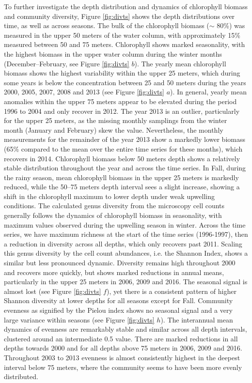 \documentclass[draft]{agujournal2019}
\begin{document}
To further investigate the depth distribution and dynamics of chlorophyll biomass and community diversity, Figure \ref{fig:divts} shows the depth distributions over time, as well as across seasons. The bulk of the chlorophyll biomass ($\sim$ 80\%) was measured in the upper 50 meters of the water column, with approximately 15\% measured between 50 and 75 meters. Chlorophyll shows marked seasonality, with the highest biomass in the upper water column during the winter months (December–February, see Figure \ref{fig:divts} $b$). The yearly mean chlorophyll biomass shows the highest variability within the upper 25 meters, which during some years is below the concentration between 25 and 50 meters during the years 2000, 2005, 2007, 2008 and 2013 (see Figure \ref{fig:divts} $a$). In general, yearly mean anomalies within the upper 75 meters appear to be elevated during the period 1996 to 2004 and only recover in 2012. The year 2013 is an outlier, particularly for the upper 25 meters, as the missing monthly samplings from the winter month (January and February) skew the value. Nevertheless, the monthly measurements for the remainder of the year 2013 show a markedly lower biomass (65\% compared to the mean over the entire time series for these months), which recovers in 2014. Chlorophyll biomass below 50 meters depth shows a relatively stable distribution throughout the year and across the time series. In Fall, during the rainy season, mean chlorophyll biomass in the upper 25 meters is markedly reduced, while the 50–75 meters depth interval sees a slight increase, showing a shift in the chlorophyll maximum to lower depth under weak upwelling conditions.
The calculated genus diversity from the microscopy cell counts generally follows the dynamics of chlorophyll biomass in seasonality, with maximum values observed during the upwelling season in winter. Across the time series, we have maximum richness at the start of the time series (1996-1997), then a reduction in diversity across all depths, which only recovers past 2011. Scaling this genus diversity by the cell count abundances, i.e. the Shannon Index, shows a similar but less pronounced dynamic. Diversity remains high throughout 2000 and recovers more quickly, but shows marked reductions in annual means, particularly in the upper 25 meters in 2006, 2009 and 2016. The seasonal signal is almost lost (see Figure \ref{fig:divts} $f$), yet there is a consistent pattern of higher Shannon diversity at lower depths for all seasons except for Fall. 
Community evenness as signified by the Pielou index shows no seasonal signal and a very large variance within seasons (see Figure \ref{fig:divts} $h$). The interannual mean dynamics of evenness are remarkably stable and similar across all depth intervals, clustered around an intermediate 0.5 value. There are marked reductions in all depths towards 2000 and for all depths above 75 meters in 2006, 2009 and 2016. Throughout 2003 to 2013 evenness is almost consistently highest in the deepest interval below 75 meters, where the community seems to have been more evenly distributed. 
\end{document}
